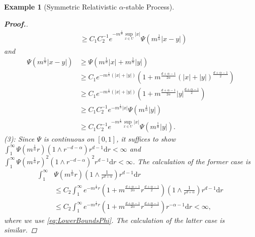 \documentclass[12pt,a4paper]{article}
\newtheorem{example}[thm]{Example}
\newcommand{\E}{\mathbb{E}}
\renewcommand{\d}{\mathrm{d}}
\newcommand{\1}{{\bf 1}}
\begin{document}
\begin{example}[Symmetric Relativistic $\alpha$-stable Process]
\begin{proof}[{\bf Proof.}]
\begin{align*}
&\geq C_1C_2^{-1}e^{-m^{\frac{1}{\alpha}}\sup_{x\in U}|x|}\Psi(m^{\frac{1}{\alpha}}|x-y|)
\end{align*}
and 
\begin{align*}
\Psi(m^{\frac{1}{\alpha}}|x-y|)&\geq \Psi(m^{\frac{1}{\alpha}}|x|+m^{\frac{1}{\alpha}}|y|)\\
&\geq C_1e^{-m^{\frac{1}{\alpha}}(|x|+|y|)}\left(1+m^{\frac{d+\alpha-1}{2\alpha}}(|x|+|y|)^{\frac{d+\alpha-1}{2}} \right)\\
&\geq C_1e^{-m^{\frac{1}{\alpha}}(|x|+|y|)}\left(1+m^{\frac{d+\alpha-1}{2\alpha}}|y|^{\frac{d+\alpha-1}{2}} \right)\\
&\geq C_1C_2^{-1}e^{-m^{\frac{1}{\alpha}}|x|}\Psi(m^{\frac{1}{\alpha}}|y|)
\\
&\geq C_1C_2^{-1}e^{-m^{\frac{1}{\alpha}}\sup_{x\in U}|x|}\Psi(m^{\frac{1}{\alpha}}|y|).
\end{align*}
(3): Since $\Psi$ is continuous on $[0,1]$, 
it suffices to show $\int_1^{\infty}\Psi(m^{\frac{1}{\alpha}}r)
\left(1\land r^{-d-\alpha} \right)r^{d-1}{\d} r<\infty$ and 
$\int_1^{\infty}\Psi(m^{\frac{1}{\alpha}}r)^2
\left(1\land r^{-d-\alpha} \right)^2r^{d-1}{\d} r<\infty$. 
The calculation of the former case is 
\begin{align*}
\int_1^{\infty}&\Psi(m^{\frac{1}{\alpha}}r)
\left(1\land \frac{1}{r^{d+\alpha}} \right)r^{d-1}{\d} r\\
&\leq C_2\int_1^{\infty}e^{-m^{\frac{1}{\alpha}}r}(1+m^{\frac{d+\alpha-1}{2\alpha}}r^{\frac{d+\alpha-1}{2}})
\left(1\land \frac{1}{r^{d+\alpha}}\right)r^{d-1}{\d} r\\
&\leq C_2\int_1^{\infty}e^{-m^{\frac{1}{\alpha}}r}
(1+m^{\frac{d+\alpha-1}{2\alpha}}r^{\frac{d+\alpha-1}{2}})
r^{-\alpha-1}{\d} r
<\infty,
\end{align*}
where we use \eqref{eq:LowerBoundsPhi}. The calculation of the latter case is similar. 
\end{proof}


\end{example}
\end{document}
